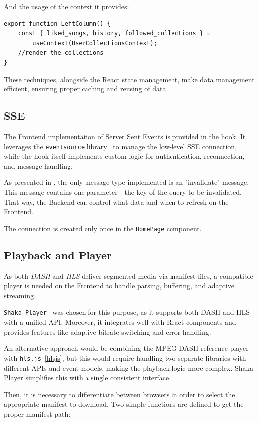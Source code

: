 And the usage of the context it provides:
\begin{verbatim}
export function LeftColumn() {
    const { liked_songs, history, followed_collections } =
        useContext(UserCollectionsContext);
    //render the collections
}
\end{verbatim}

These techniques, alongside the React state management, make data management efficient, ensuring proper caching and
reusing of data.

\subsection{SSE}
The Frontend implementation of Server Sent Events is provided in the  hook.
It leverages the \texttt{eventsource} library~\cite{eventsource} to manage the low-level SSE connection,
while the hook itself implements custom logic for authentication, reconnection, and message handling.

As presented in , the only message type implemented is an "invalidate" message.
This message contains one parameter - the key of the query to be invalidated.
That way, the Backend can control what data and when to refresh on the Frontend.

The connection is created only once in the \texttt{HomePage} component.

\subsection{Playback and Player}
As both \textit{DASH} and \textit{HLS} deliver segmented media via manifest files,
a compatible player is needed on the Frontend to handle parsing, buffering, and adaptive streaming.

\texttt{Shaka Player}~\cite{shaka} was chosen for this purpose, as it supports both DASH and HLS with a unified API.
Moreover, it integrates well with React components and provides features like
adaptive bitrate switching and error handling.

An alternative approach would be combining the MPEG-DASH reference player~\cite{dashref}
with \texttt{hls.js}~\ref{hlsjs}, but this would require handling two separate
libraries with different APIs and event models, making the playback logic more complex.
Shaka Player simplifies this with a single consistent interface.

Then, it is necessary to differentiate between browsers in order to select the appropriate manifest to download.
Two simple functions are defined to get the proper manifest path:

